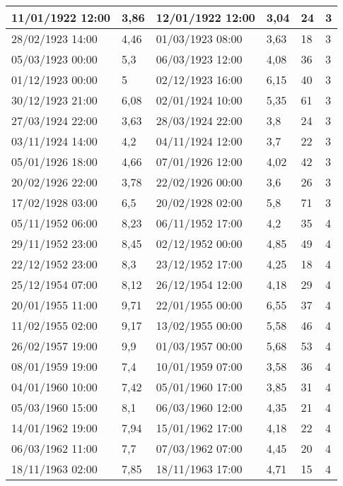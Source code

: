 \begin{longtable}{|p{3cm}|p{2.1cm}|p{3cm}|p{2cm}|l|l|}
        11/01/1922 12:00 & 3,86 & 12/01/1922 12:00 & 3,04 & 24 & 3 \\ \hline
        28/02/1923 14:00 & 4,46 & 01/03/1923 08:00 & 3,63 & 18 & 3 \\ \hline
        05/03/1923 00:00 & 5,3 & 06/03/1923 12:00 & 4,08 & 36 & 3 \\ \hline
        01/12/1923 00:00 & 5 & 02/12/1923 16:00 & 6,15 & 40 & 3 \\ \hline
        30/12/1923 21:00 & 6,08 & 02/01/1924 10:00 & 5,35 & 61 & 3 \\ \hline
        27/03/1924 22:00 & 3,63 & 28/03/1924 22:00 & 3,8 & 24 & 3 \\ \hline
        03/11/1924 14:00 & 4,2 & 04/11/1924 12:00 & 3,7 & 22 & 3 \\ \hline
        05/01/1926 18:00 & 4,66 & 07/01/1926 12:00 & 4,02 & 42 & 3 \\ \hline
        20/02/1926 22:00 & 3,78 & 22/02/1926 00:00 & 3,6 & 26 & 3 \\ \hline
        17/02/1928 03:00 & 6,5 & 20/02/1928 02:00 & 5,8 & 71 & 3 \\ \hline
        05/11/1952 06:00 & 8,23 & 06/11/1952 17:00 & 4,2 & 35 & 4 \\ \hline
        29/11/1952 23:00 & 8,45 & 02/12/1952 00:00 & 4,85 & 49 & 4 \\ \hline
        22/12/1952 23:00 & 8,3 & 23/12/1952 17:00 & 4,25 & 18 & 4 \\ \hline
        25/12/1954 07:00 & 8,12 & 26/12/1954 12:00 & 4,18 & 29 & 4 \\ \hline
        20/01/1955 11:00 & 9,71 & 22/01/1955 00:00 & 6,55 & 37 & 4 \\ \hline
        11/02/1955 02:00 & 9,17 & 13/02/1955 00:00 & 5,58 & 46 & 4 \\ \hline
        26/02/1957 19:00 & 9,9 & 01/03/1957 00:00 & 5,68 & 53 & 4 \\ \hline
        08/01/1959 19:00 & 7,4 & 10/01/1959 07:00 & 3,58 & 36 & 4 \\ \hline
        04/01/1960 10:00 & 7,42 & 05/01/1960 17:00 & 3,85 & 31 & 4 \\ \hline
        05/03/1960 15:00 & 8,1 & 06/03/1960 12:00 & 4,35 & 21 & 4 \\ \hline
        14/01/1962 19:00 & 7,94 & 15/01/1962 17:00 & 4,18 & 22 & 4 \\ \hline
        06/03/1962 11:00 & 7,7 & 07/03/1962 07:00 & 4,45 & 20 & 4 \\ \hline
        18/11/1963 02:00 & 7,85 & 18/11/1963 17:00 & 4,71 & 15 & 4 \\ \hline

\end{longtable}
